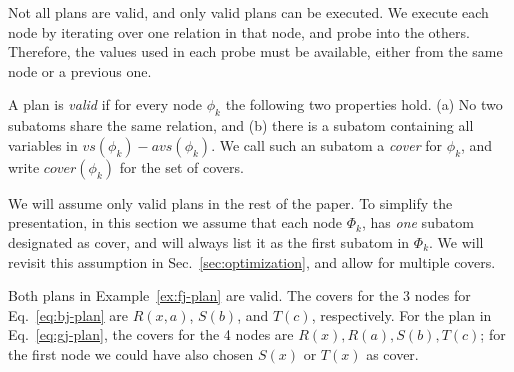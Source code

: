 
Not all \FJ plans are valid, and only valid plans can be executed.  We
execute each \FJ node by iterating over one relation in that node, and
probe into the others.  Therefore, the values used in each probe must
be available, either from the same node or a previous one.

\begin{definition}
  A \FJ plan is \emph{valid} if for every node $\phi_k$ the following
  two properties hold.  (a) No two subatoms share the same relation,
  and (b) there is a subatom containing all variables in
  $vs(\phi_k) - avs(\phi_k)$.  We call such an subatom a \emph{cover}
  for $\phi_k$, and write $cover(\phi_k)$ for the set of covers.
\end{definition}

We will assume only valid plans in the rest of the paper.  To simplify
the presentation, in this section we assume that each node $\Phi_k$,
has {\em one} subatom designated as cover, and will always list it as
the first subatom in $\Phi_k$.  We will revisit this assumption in
Sec.~\ref{sec:optimization}, and allow for multiple covers.


\begin{example}
  Both plans in Example~\ref{ex:fj-plan} are valid.  The covers for
  the 3 nodes for Eq.~\eqref{eq:bj-plan} are $R(x, a)$, $S(b)$, and
  $T(c)$, respectively. For the plan in Eq.~\eqref{eq:gj-plan}, the
  covers for the 4 nodes are $R(x), R(a), S(b), T(c)$; for the first
  node we could have also chosen $S(x)$ or $T(x)$ as cover.
\end{example}
 

